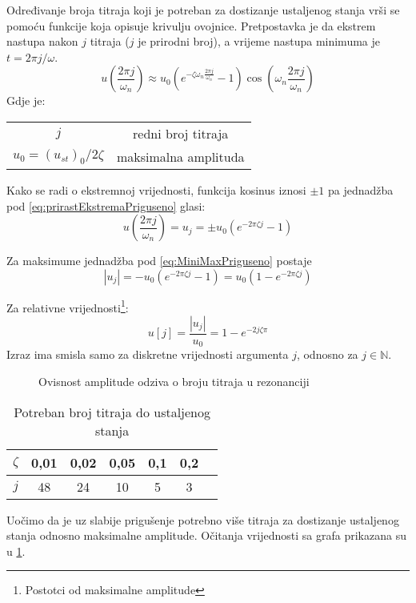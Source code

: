 Određivanje broja titraja koji je potreban za dostizanje ustaljenog stanja vrši
se pomoću funkcije koja opisuje krivulju ovojnice. Pretpostavka je da ekstrem
nastupa nakon $j$ titraja ($j$ je prirodni broj), a vrijeme nastupa minimuma je
$t=2\pi j/\omega$. 
\begin{equation}\label{eq:prirastEkstremaPriguseno}
    u\left(\frac{2\pi j}{\omega_n}\right) \approx
        u_0(e^{-\zeta\omega_n\frac{2\pi j}{\omega_n}}-1)\cos\left(\omega_n\frac{2\pi
        j}{\omega_n}\right)
\end{equation}
Gdje je:
\begin{table}[H]
    \begin{tabular}{c c}
        $j$ & redni broj titraja\\
        $u_0=(u_{st})_0/2\zeta$ & maksimalna amplituda\\
    \end{tabular}
\end{table}
Kako se radi o ekstremnoj vrijednosti, funkcija kosinus iznosi $\pm 1$ pa jednadžba
pod \eqref{eq:prirastEkstremaPriguseno} glasi:
\begin{equation}\label{eq:MiniMaxPriguseno}
     u\left(\frac{2\pi j}{\omega_n}\right) = u_j = 
        \pm u_0(e^{-2\pi\zeta j}-1)
\end{equation}

Za maksimume jednadžba pod \eqref{eq:MiniMaxPriguseno} postaje
\begin{equation}
    |u_j| = -u_0(e^{-2\pi\zeta j} -1) = u_0(1-e^{-2\pi\zeta j})
\end{equation}

Za relativne vrijednosti\footnote{Postotci od maksimalne amplitude}:
\begin{equation}
    u[j] = \frac{|u_j|}{u_0}=1-e^{-2j\zeta\pi}
\end{equation}
Izraz ima smisla samo za diskretne vrijednosti argumenta $j$, odnosno za $j \in
\mathbb{N}$.

\par
\begin{figure}[H]
    
    \label{fig:prirast-rezonanca-priguseno}
    \caption{Ovisnost amplitude odziva o broju titraja u rezonanciji}
\end{figure}

\begin{table}[H]
    \begin{tabular}{|*{7}{c|}} %
        \hline
        $\zeta$ & 0,01 & 0,02 & 0,05 & 0,1 & 0,2\\
        \hline
        $j$ & 48 & 24 & 10 & 5 & 3\\
        \hline
    \end{tabular}
    \caption{Potreban broj titraja do ustaljenog stanja}
    \label{table:prirast-rezonanca-priguseno}
\end{table}

Uočimo da je uz slabije prigušenje potrebno više titraja za dostizanje ustaljenog
stanja odnosno maksimalne amplitude. Očitanja vrijednosti sa grafa prikazana su u
\ref{table:prirast-rezonanca-priguseno}.



